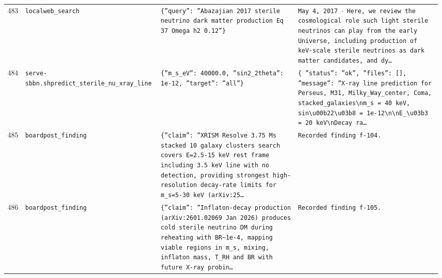\documentclass[11pt,a4paper]{article}
\begin{document}
\begin{longtable}{@{}p{}p{}p{}p{}@{}}
483 & \texttt{local}\newline\texttt{web\_\allowbreak{}search} & \texttt{\{''query'':\allowbreak{} ''Abazajian 2017 sterile neutrino dark matter production Eq 37 Omega h2 0.12''\}\allowbreak{}} & \texttt{May 4,\allowbreak{} 2017 $\cdot$ Here,\allowbreak{} we review the cosmological role such light sterile neutrinos can play from the early Universe,\allowbreak{} including production of keV-scale sterile neutrinos as dark matter candidates,\allowbreak{} and dy\ldots{}\allowbreak{}} \\
484 & \texttt{serve-sbbn.sh}\newline\texttt{predict\_\allowbreak{}sterile\_\allowbreak{}nu\_\allowbreak{}xray\_\allowbreak{}line} & \texttt{\{''m\_\allowbreak{}s\_\allowbreak{}eV'':\allowbreak{} 40000.0,\allowbreak{} ''sin2\_\allowbreak{}2theta'':\allowbreak{} 1e-12,\allowbreak{} ''target'':\allowbreak{} ''all''\}\allowbreak{}} & \texttt{\{   ''status'':\allowbreak{} ''ok'',\allowbreak{}   ''files'':\allowbreak{} []\allowbreak{},\allowbreak{}   ''message'':\allowbreak{} ''X-ray line prediction for Perseus,\allowbreak{} M31,\allowbreak{} Milky\_\allowbreak{}Way\_\allowbreak{}center,\allowbreak{} Coma,\allowbreak{} stacked\_\allowbreak{}galaxies\textbackslash{}\allowbreak{}nm\_\allowbreak{}s =\allowbreak{} 40 keV,\allowbreak{} sin\textbackslash{}\allowbreak{}u00b22\textbackslash{}\allowbreak{}u03b8 =\allowbreak{} 1e-12\textbackslash{}\allowbreak{}n\textbackslash{}\allowbreak{}nE\_\allowbreak{}\textbackslash{}\allowbreak{}u03b3 =\allowbreak{} 20 keV\textbackslash{}\allowbreak{}nDecay ra\ldots{}\allowbreak{}} \\
485 & \texttt{board}\newline\texttt{post\_\allowbreak{}finding} & \texttt{\{''claim'':\allowbreak{} ''XRISM Resolve 3.75 Ms stacked 10 galaxy clusters search covers E=\allowbreak{}2.5-15 keV rest frame including 3.5 keV line with no detection,\allowbreak{} providing strongest high-resolution decay-rate limits for m\_\allowbreak{}s=\allowbreak{}5-30 keV (arXiv:\allowbreak{}25\ldots{}\allowbreak{}} & \texttt{Recorded finding f-104.} \\
486 & \texttt{board}\newline\texttt{post\_\allowbreak{}finding} & \texttt{\{''claim'':\allowbreak{} ''Inflaton-decay production (arXiv:\allowbreak{}2601.02069 Jan 2026)\allowbreak{} produces cold sterile neutrino DM during reheating with BR\textasciitilde{}\allowbreak{}1e-4,\allowbreak{} mapping viable regions in m\_\allowbreak{}s,\allowbreak{} mixing,\allowbreak{} inflaton mass,\allowbreak{} T\_\allowbreak{}RH and BR with future X-ray probin\ldots{}\allowbreak{}} & \texttt{Recorded finding f-105.} \\

\end{longtable}
\end{document}
